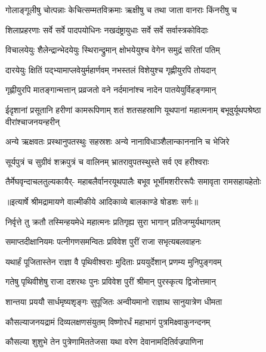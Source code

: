 \twolineshloka
{गोलाङ्गूलीषु चोत्पन्नाः केचित्सम्मतविक्रमाः}
{ऋक्षीषु च तथा जाता वानराः किंनरीषु च} %

\twolineshloka
{शिलाप्रहरणाः सर्वे सर्वे पादपयोधिनः}
{नखदंष्ट्रायुधाः सर्वे सर्वे सर्वास्त्रकोविदाः} %

\twolineshloka
{विचालयेयुः शैलेन्द्रान्भेदयेयुः स्थिरान्द्रुमान्}
{क्षोभयेयुश्च वेगेन समुद्रं सरितां पतिम्} %

\twolineshloka
{दारयेयुः क्षितिं पद्भ्यामाप्लवेयुर्महार्णवम्}
{नभस्तलं विशेयुश्च गृह्णीयुरपि तोयदान्} %

\twolineshloka
{गृह्णीयुरपि मातङ्गान्मत्तान् प्रव्रजतो वने}
{नर्दमानांश्च नादेन पातयेयुर्विहङ्गमान्} %

\threelineshloka
{ईदृशानां प्रसूतानि हरीणां कामरूपिणाम्}
{शतं शतसहस्राणि यूथपानां महात्मनाम्}
{बभूवुर्यूथपश्रेष्ठा वीरांश्चाजनयन्हरीन्} %

\twolineshloka
{अन्ये ऋक्षवतः प्रस्थानुपतस्थुः सहस्रशः}
{अन्ये नानाविधाञ्शैलान्काननानि च भेजिरे} %

\twolineshloka
{सूर्यपुत्रं च सुग्रीवं शक्रपुत्रं च वालिनम्}
{भ्रातरावुपतस्थुस्ते सर्व एव हरीश्वराः} %

\fourlineindentedshloka
{तैर्मेघवृन्दाचलतुल्यकायैर्-}
{महाबलैर्वानरयूथपालैः}
{बभूव भूर्भीमशरीररूपैः}
{समावृता रामसहायहेतोः} %


{॥इत्यार्षे श्रीमद्रामायणे वाल्मीकीये आदिकाव्ये बालकाण्डे षोडशः सर्गः॥}


\twolineshloka
{निर्वृत्ते तु क्रतौ तस्मिन्हयमेधे महात्मनः}
{प्रतिगृह्य सुरा भागान् प्रतिजग्मुर्यथागतम्} %

\twolineshloka
{समाप्तदीक्षानियमः पत्नीगणसमन्वितः}
{प्रविवेश पुरीं राजा सभृत्यबलवाहनः} %

\twolineshloka
{यथार्हं पूजितास्तेन राज्ञा वै पृथिवीश्वराः}
{मुदिताः प्रययुर्देशान् प्रणम्य मुनिपुङ्गवम्} %

\twolineshloka
{गतेषु पृथिवीशेषु राजा दशरथः पुनः}
{प्रविवेश पुरीं श्रीमान् पुरस्कृत्य द्विजोत्तमान्} %

\twolineshloka
{शान्तया प्रययौ सार्धमृष्यशृङ्गः सुपूजितः}
{अन्वीयमानो राज्ञाथ सानुयात्रेण धीमता} %

\twolineshloka
{कौसल्याजनयद्रामं दिव्यलक्षणसंयुतम्}
{विष्णोरर्धं महाभागं पुत्रमिक्ष्वाकुनन्दनम्} %

\twolineshloka
{कौसल्या शुशुभे तेन पुत्रेणामिततेजसा}
{यथा वरेण देवानामदितिर्वज्रपाणिना} %

